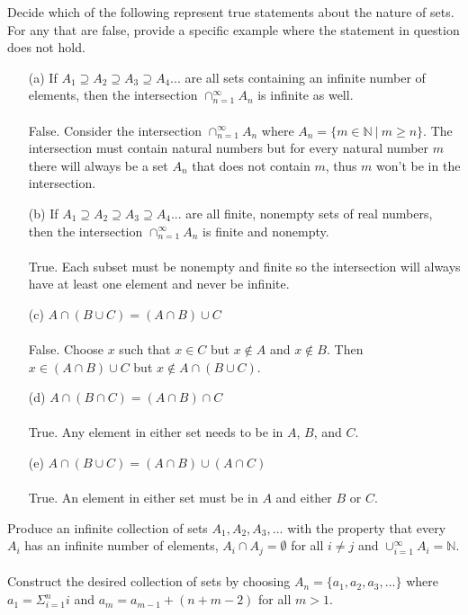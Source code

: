 \documentclass[11pt]{article}
\def\N{{\mathbb{N}}}
\newenvironment{exer}[1]
    {\renewcommand\theinnercustomexer{#1}\innercustomexer\upshape}
    {\endinnercustomexer}
\begin{document}
\begin{exer}{1.2.3}
    Decide which of the following represent true statements about the nature of sets. For any that are false, provide a specific example where the statement in question does not hold.
    \begin{enumerate}
        \item[(a)]
            If $A_1\supseteq A_2\supseteq A_3\supseteq A_4...$ are all sets containing an infinite number of elements, then the intersection $\cap_{n=1}^{\infty} A_n$ is infinite as well. \\ \\
            False. Consider the intersection $\cap_{n=1}^{\infty} A_n$ where $A_n=\{m\in\N~|~m\geq n\}$. The intersection must contain natural numbers but for every natural number $m$ there will always be a set $A_n$ that does not contain $m$, thus $m$ won't be in the intersection.
        \item[(b)]
            If $A_1\supseteq A_2\supseteq A_3\supseteq A_4...$ are all finite, nonempty sets of real numbers, then the intersection $\cap_{n=1}^{\infty}A_n$ is finite and nonempty. \\ \\
            True. Each subset must be nonempty and finite so the intersection will always have at least one element and never be infinite.
        \item[(c)]
            $A\cap(B\cup C)=(A\cap B)\cup C$ \\ \\
            False. Choose $x$ such that $x\in C$ but $x\notin A$ and $x\notin B$. Then $x\in (A\cap B)\cup C$ but $x\notin A\cap(B\cup C)$.
        \item[(d)]
            $A\cap(B\cap C)=(A\cap B)\cap C$ \\ \\
            True. Any element in either set needs to be in $A$, $B$, and $C$.
        \item[(e)]
            $A\cap(B\cup C)=(A\cap B)\cup(A\cap C)$ \\ \\
            True. An element in either set must be in $A$ and either $B$ or $C$.
    \end{enumerate}
\end{exer}
\begin{exer}{1.2.4}
    Produce an infinite collection of sets $A_1,A_2,A_3,...$ with the property that every $A_i$ has an infinite number of elements, $A_i\cap A_j=\emptyset$ for all $i\neq j$ and $\cup_{i=1}^{\infty}A_i=\N$. \\ \\
    Construct the desired collection of sets by choosing $A_n=\{a_1, a_2, a_3,...\}$ where $a_1=\Sigma_{i=1}^{n}i$ and $a_m=a_{m-1}+(n+m-2)$ for all $m>1$.
\end{exer}
\end{document}

